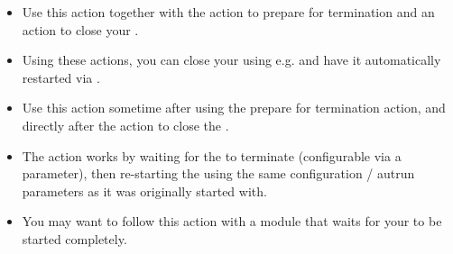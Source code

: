 
\begin{itemize}
\item Use this action together with the action to prepare for \gdaut{} termination and an action to close your \gdaut{}. 
\item Using these actions, you can close your \gdaut{} using e.g.  and have it automatically restarted via \app{}.
\item Use this action sometime after using the prepare for termination action, and directly after the action to close the \gdaut{}. 
\item The action works by waiting for the \gdaut{} to terminate (configurable via a parameter), then re-starting the \gdaut{} using the same configuration / autrun parameters as it was originally started with.
\item You may want to follow this action with a module that waits for your \gdaut{} to be started completely.
\end{itemize}

